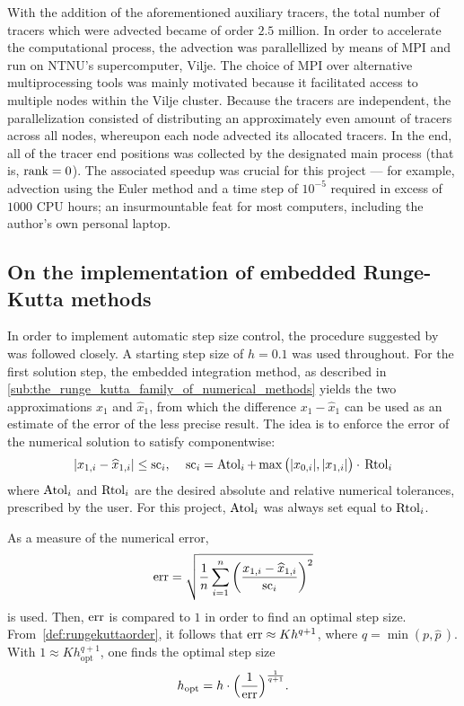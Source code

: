 With the addition of the aforementioned auxiliary tracers, the total number
of tracers which were advected became of order $2.5$ million. In order to
accelerate the computational process, the advection was parallellized by means
of MPI and run on NTNU's supercomputer, Vilje. The choice of MPI over
alternative multiprocessing tools was mainly motivated because it facilitated
access to multiple nodes within the Vilje cluster. Because the tracers are
independent, the parallelization consisted of distributing an approximately
even amount of tracers across all nodes, whereupon each node advected its
allocated tracers. In the end, all of the tracer end positions was collected
by the designated main process (that is, $\textnormal{rank}=0$). The
associated speedup was crucial for this project --- for example, advection using
the Euler method and a time step of $10^{-5}$ required in excess of $1000$
CPU hours; an insurmountable feat for most computers, including the author's own
personal laptop.

\subsection{On the implementation of embedded Runge-Kutta methods}
\label{sub:on_the_implementation_of_embedded_runge_kutta_methods}

In order to implement automatic step size control, the procedure suggested
by \textcite[pp.167--168]{hairer1993solving} was followed
closely. A starting step size of $h=0.1$ was used throughout. For the first
solution step, the embedded integration method, as described in
\cref{sub:the_runge_kutta_family_of_numerical_methods} yields the two
approximations $x_{1}$ and $\widehat{x}_{1}$, from which the difference
$x_{1}-\widehat{x}_{1}$ can be used as an estimate of the error of the less
precise result. The idea is to enforce the error of the numerical solution to
satisfy componentwise:
\begin{equation}
    \label{eq:embeddederror}
    \abs{x_{1,i}-\widehat{x}_{1,i}} \leq \scem_{i},\quad{}%
    \scem_{i}=\atol_{i}+\max\big(\abs{x_{0,i}},\abs{x_{1,i}}\big)\cdot{}\rtol_{i}
\end{equation}
where $\operatorname{Atol}_{i}$ and $\operatorname{Rtol}_{i}$ are the desired absolute and relative
numerical tolerances, prescribed by the user. For this project, $\operatorname{Atol}_{i}$ was
always set equal to $\operatorname{Rtol}_{i}$.

As a measure of the numerical error,
\begin{equation}
    \label{eq:embeddednumericalerror}
    \errem = \sqrt{\frac{1}{n}\sum\limits_{i=1}^{n}%
    {\bigg(\frac{x_{1,i}-\widehat{x}_{1,i}}{\scem_{i}}\bigg)}^{2}}
\end{equation}
is used. Then, $\operatorname{err}$ is compared to $1$ in order to find an optimal step
size. From~\cref{def:rungekuttaorder}, it follows that $\operatorname{err}\approx{}Kh^{q+1}$,
where $q=\min(p,\widehat{p}\,)$. With $1\approx{}Kh_{\mathrm{opt}}^{q+1}$,
one finds the optimal step size
\begin{equation}
    \label{eq:embeddedoptimalstepsize}
    h_{\mathrm{opt}}=h\cdot\Big(\frac{1}{\operatorname{err}}\Big)^{\frac{1}{q+1}}.
\end{equation}

